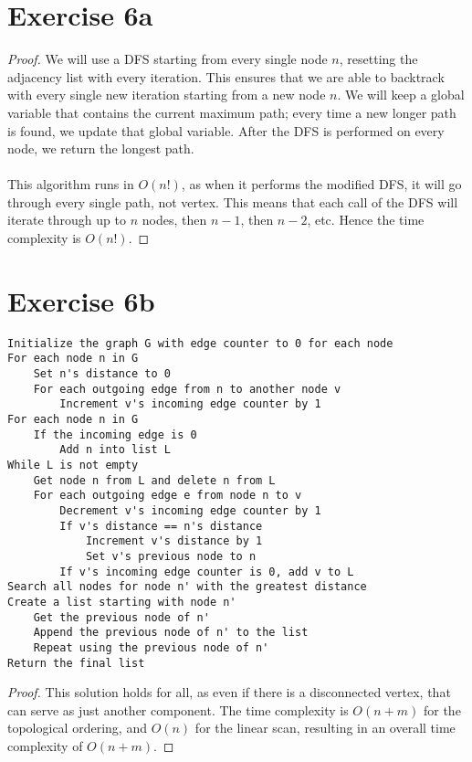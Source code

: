 \documentclass[11pt]{article}
\begin{document}
\section*{Exercise 6a}
\begin{proof}
We will use a DFS starting from every single node $n$, resetting the adjacency list with every iteration. This ensures that we are able to backtrack with every single new iteration starting from a new node $n$. We will keep a global variable that contains the current maximum path; every time a new longer path is found, we update that global variable. After the DFS is performed on every node, we return the longest path. \\ \\
This algorithm runs in $O(n!)$, as when it performs the modified DFS, it will go through every single path, not vertex. This means that each call of the DFS will iterate through up to $n$ nodes, then $n-1$, then $n-2$, etc. Hence the time complexity is $O(n!)$.
\end{proof}
\newpage

\section*{Exercise 6b}
\begin{lstlisting}
Initialize the graph G with edge counter to 0 for each node
For each node n in G
	Set n's distance to 0
	For each outgoing edge from n to another node v
		Increment v's incoming edge counter by 1
For each node n in G
	If the incoming edge is 0
		Add n into list L
While L is not empty
	Get node n from L and delete n from L
	For each outgoing edge e from node n to v
		Decrement v's incoming edge counter by 1
		If v's distance == n's distance
			Increment v's distance by 1
			Set v's previous node to n
		If v's incoming edge counter is 0, add v to L
Search all nodes for node n' with the greatest distance
Create a list starting with node n'
	Get the previous node of n'
	Append the previous node of n' to the list
	Repeat using the previous node of n'
Return the final list
\end{lstlisting}
\begin{proof}
This solution holds for all, as even if there is a disconnected vertex, that can serve as just another component. 
The time complexity is $O(n + m)$ for the topological ordering, and $O(n)$ for the linear scan, resulting in an overall time complexity of $O(n + m)$.
\end{proof}
\end{document}
